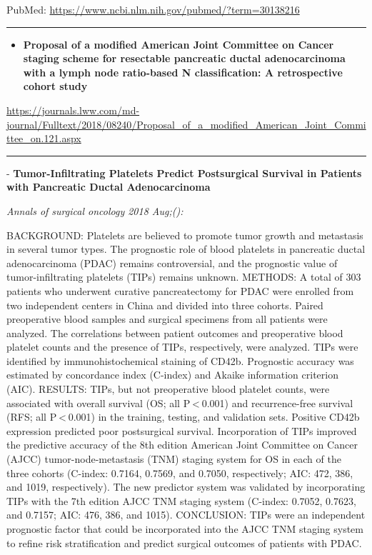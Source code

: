 \documentclass[]{article}
\providecommand{\tightlist}{%
  \setlength{\itemsep}{0pt}\setlength{\parskip}{0pt}}
\begin{document}
PubMed: \url{https://www.ncbi.nlm.nih.gov/pubmed/?term=30138216}

{}

{}

\begin{center}\rule{0.5\linewidth}{\linethickness}\end{center}

\begin{itemize}
\tightlist
\item
  \textbf{Proposal of a modified American Joint Committee on Cancer
  staging scheme for resectable pancreatic ductal adenocarcinoma with a
  lymph node ratio-based N classification: A retrospective cohort study}
\end{itemize}

\url{https://journals.lww.com/md-journal/Fulltext/2018/08240/Proposal_of_a_modified_American_Joint_Committee_on.121.aspx}

\begin{center}\rule{0.5\linewidth}{\linethickness}\end{center}

 - \textbf{Tumor-Infiltrating Platelets Predict Postsurgical Survival in
Patients with Pancreatic Ductal Adenocarcinoma}

\emph{Annals of surgical oncology 2018 Aug;():}

BACKGROUND: Platelets are believed to promote tumor growth and
metastasis in several tumor types. The prognostic role of blood
platelets in pancreatic ductal adenocarcinoma (PDAC) remains
controversial, and the prognostic value of tumor-infiltrating platelets
(TIPs) remains unknown. METHODS: A total of 303 patients who underwent
curative pancreatectomy for PDAC were enrolled from two independent
centers in China and divided into three cohorts. Paired preoperative
blood samples and surgical specimens from all patients were analyzed.
The correlations between patient outcomes and preoperative blood
platelet counts and the presence of TIPs, respectively, were analyzed.
TIPs were identified by immunohistochemical staining of CD42b.
Prognostic accuracy was estimated by concordance index (C-index) and
Akaike information criterion (AIC). RESULTS: TIPs, but not preoperative
blood platelet counts, were associated with overall survival (OS; all
P \textless{} 0.001) and recurrence-free survival (RFS; all
P \textless{} 0.001) in the training, testing, and validation sets.
Positive CD42b expression predicted poor postsurgical survival.
Incorporation of TIPs improved the predictive accuracy of the 8th
edition American Joint Committee on Cancer (AJCC) tumor-node-metastasis
(TNM) staging system for OS in each of the three cohorts (C-index:
0.7164, 0.7569, and 0.7050, respectively; AIC: 472, 386, and 1019,
respectively). The new predictor system was validated by incorporating
TIPs with the 7th edition AJCC TNM staging system (C-index: 0.7052,
0.7623, and 0.7157; AIC: 476, 386, and 1015). CONCLUSION: TIPs were an
independent prognostic factor that could be incorporated into the AJCC
TNM staging system to refine risk stratification and predict surgical
outcomes of patients with PDAC.
\end{document}
